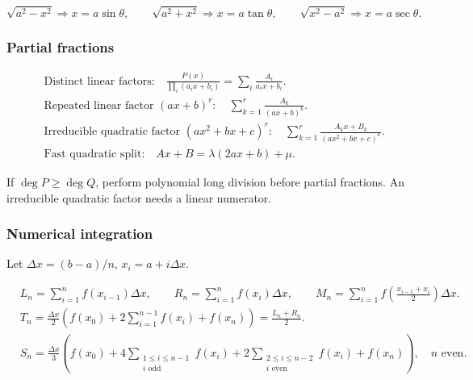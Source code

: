 \begin{keyformula}[title={Trigonometric Substitution Map}]
\[
\sqrt{a^2-x^2}\Rightarrow x=a\sin\theta,
\qquad
\sqrt{a^2+x^2}\Rightarrow x=a\tan\theta,
\qquad
\sqrt{x^2-a^2}\Rightarrow x=a\sec\theta.
\]
\end{keyformula}

\subsubsection{Partial fractions}
\begin{keyformula}[title={Partial Fraction Templates}]
\begin{align*}
&\text{Distinct linear factors:}\quad
\frac{P(x)}{\prod_i(a_i x+b_i)}=\sum_i\frac{A_i}{a_i x+b_i}.\\
&\text{Repeated linear factor }(ax+b)^r:\quad
\sum_{k=1}^r\frac{A_k}{(ax+b)^k}.\\
&\text{Irreducible quadratic factor }(ax^2+bx+c)^r:\quad
\sum_{k=1}^r\frac{A_kx+B_k}{(ax^2+bx+c)^k}.\\
&\text{Fast quadratic split:}\quad
Ax+B=\lambda(2ax+b)+\mu.
\end{align*}
\end{keyformula}

\begin{commonmistake}
If \(\deg P\ge \deg Q\), perform polynomial long division before partial
fractions.  An irreducible quadratic factor needs a linear numerator.
\end{commonmistake}

\subsubsection{Numerical integration}
Let \(\Delta x=(b-a)/n\), \(x_i=a+i\Delta x\).
\begin{keyformula}[title={Left, Right, Midpoint, Trapezoidal, Simpson Rules}]
\begin{align*}
&L_n=\sum_{i=1}^n f(x_{i-1})\Delta x,
\qquad
R_n=\sum_{i=1}^n f(x_i)\Delta x,
\qquad
M_n=\sum_{i=1}^n f\!\left(\frac{x_{i-1}+x_i}{2}\right)\Delta x.\\
&T_n=\frac{\Delta x}{2}\left(f(x_0)+2\sum_{i=1}^{n-1}f(x_i)+f(x_n)\right)=\frac{L_n+R_n}{2}.\\
&S_n=\frac{\Delta x}{3}\left(f(x_0)+4\sum_{\substack{1\le i\le n-1\\ i\text{ odd}}}f(x_i)+2\sum_{\substack{2\le i\le n-2\\ i\text{ even}}}f(x_i)+f(x_n)\right),
\quad n\text{ even}.
\end{align*}
\end{keyformula}

